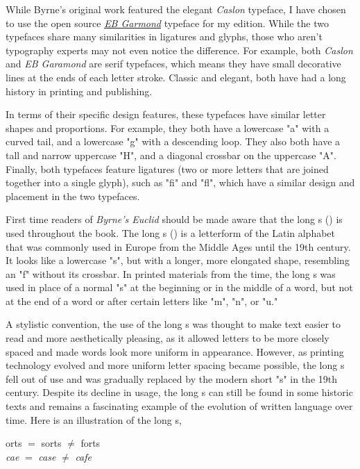 \documentclass[twoside,11pt]{report}
\begin{document}
While Byrne's original work featured the elegant \textit{Caslon} typeface, I have chosen to use the open source \href{https://github.com/georgd/EB-Garamond}{\textit{EB Garmond}} typeface for my edition. While the two typefaces share many similarities in ligatures and glyphs, those who aren't typography experts may not even notice the difference.  For example, both \textit{Caslon} and \textit{EB Garamond} are serif typefaces, which means they have small decorative lines at the ends of each letter stroke. Classic and elegant, both have had a long history in printing and publishing.

In terms of their specific design features, these typefaces have similar letter shapes and proportions. For example, they both have a lowercase "a" with a curved tail, and a lowercase "g" with a descending loop. They also both have a tall and narrow uppercase "H", and a diagonal crossbar on the uppercase "A".  Finally, both typefaces feature ligatures (two or more letters that are joined together into a single glyph), such as "fi" and "fl", which have a similar design and placement in the two typefaces.

First time readers of \textit{Byrne's Euclid} should be made aware that the long s ({\color{cred}{ſ}}) is used throughout the book. The long s ({\color{cred}{ſ}}) is a letterform of the Latin alphabet that was commonly used in Europe from the Middle Ages until the 19th century. It looks like a lowercase "s", but with a longer, more elongated shape, resembling an "f" without its crossbar. In printed materials from the time, the long s was used in place of a normal "s" at the beginning or in the middle of a word, but not at the end of a word or after certain letters like "m", "n", or "u."

A stylistic convention, the use of the long s was thought to make text easier to read and more aesthetically pleasing, as it allowed letters to be more closely spaced and made words look more uniform in appearance. However, as printing technology evolved and more uniform letter spacing became possible, the long s fell out of use and was gradually replaced by the modern short "s" in the 19th century. Despite its decline in usage, the long s can still be found in some historic texts and remains a fascinating example of the evolution of written language over time.  Here is an illustration of the long s,
\begin{center}
  {\color{cred}{ſ}}orts $=$ sorts $\neq$ forts\\
  \textit{ca{\color{cred}{ſ}}e} $=$ \textit{case} $\neq$ \textit{cafe}
\end{center}
\end{document}
